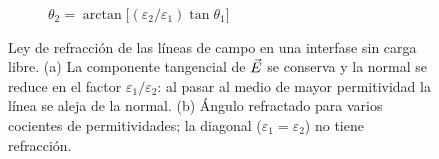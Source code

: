 \begin{figure}[t]
\begin{subfigure}[b]{0.5\textwidth}
\caption{$\theta_2=\arctan\!\big[(\varepsilon_2/\varepsilon_1)\tan\theta_1\big]$}
\end{subfigure}
\caption{Ley de refracción de las líneas de campo en una interfase sin carga libre. (a) La
componente tangencial de $\vec E$ se conserva y la normal se reduce en el factor $\varepsilon_1/\varepsilon_2$: al
pasar al medio de mayor permitividad la línea se aleja de la normal. (b) Ángulo refractado para
varios cocientes de permitividades; la diagonal ($\varepsilon_1=\varepsilon_2$) no tiene refracción.}
\label{fig:refraccion}
\end{figure}
